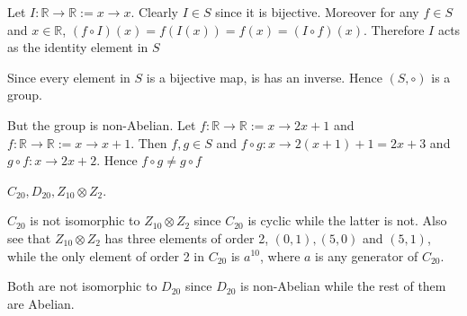 \documentclass[12pt]{exam}
\theoremstyle{plain} %
\theoremstyle{definition} %
\theoremstyle{remark} %
\begin{document}
\begin{questions}
\begin{solution}
  Let $I: \mathbb{R} \to \mathbb{R}:= x \to x$. Clearly $I \in S$ since it is bijective. Moreover for any $f \in S$ and $x \in \mathbb{R}$, $(f\circ I)(x) = f(I(x)) = f(x) = (I \circ f)(x)$. Therefore $I$ acts as the identity element in $S$

  Since every element in $S$ is a bijective map, is has an inverse. Hence $(S, \circ)$ is a group.

  But the group is non-Abelian. Let $f: \mathbb{R} \to \mathbb{R}:= x \to 2x + 1$ and $f: \mathbb{R} \to \mathbb{R}:= x \to x+1$. Then $f, g \in S$ and $f \circ g : x \to 2(x+1) + 1 = 2x +3$ and $g \circ f: x \to 2x+2$. Hence $f\circ g \neq g \circ f$
\end{solution}

\question
\begin{solution}
\end{solution}

\question
\begin{solution}
  $C_{20}, D_{20}, Z_{10} \otimes Z_2$.

  $C_{20}$ is not isomorphic to $Z_{10}\otimes Z_{2}$ since $C_{20}$ is cyclic while the latter is not. Also see that $Z_{10}\otimes Z_{2}$ has three elements of order 2, $(0, 1), (5, 0)$ and $(5, 1)$, while the only element of order 2 in $C_{20}$ is $a^{10}$, where $a$ is any generator of $C_{20}$.

  Both are not isomorphic to $D_{20}$ since $D_{20}$ is non-Abelian while the rest of them are Abelian.
\end{solution}

\end{questions}
\end{document}
